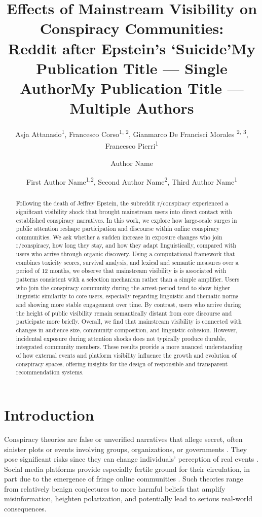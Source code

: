 \documentclass[letterpaper]{article} %
\title{Effects of Mainstream Visibility on Conspiracy Communities:\\Reddit after Epstein's `Suicide'}
\author{
    Asja Attanasio\textsuperscript{\rm 1},
    Francesco Corso\textsuperscript{\rm 1, \rm2},
    Gianmarco De Francisci Morales\textsuperscript{ \rm2, \rm3},
    Francesco Pierri\textsuperscript{\rm 1}
}
\title{My Publication Title --- Single Author}
\author {
    Author Name
}
\title{My Publication Title --- Multiple Authors}
\author {
    First Author Name\textsuperscript{\rm 1,\rm 2},
    Second Author Name\textsuperscript{\rm 2},
    Third Author Name\textsuperscript{\rm 1}
}
\begin{document}
\maketitle

\begin{abstract}
Following the death of Jeffrey Epstein, the subreddit r/conspiracy experienced a significant visibility shock that brought mainstream users into direct contact with established conspiracy narratives.
In this work, we explore how large-scale surges in public attention reshape participation and discourse within online conspiracy communities.
We ask whether a sudden increase in exposure changes who join r/conspiracy, how long they stay, and how they adapt linguistically, compared with users who arrive through organic discovery. 
Using a computational framework that combines toxicity scores, survival analysis, and lexical and semantic measures over a period of 12 months, 
we observe that mainstream visibility is is associated with patterns consistent with a selection mechanism rather than a simple amplifier.
Users who join the conspiracy community during the arrest-period tend to show higher linguistic similarity to core users, especially regarding linguistic and thematic norms and showing more stable engagement over time. 
By contrast, users who arrive during the height of public visibility remain semantically distant from core discourse and participate more briefly. 
Overall, we find that mainstream visibility is connected with changes in audience size, community composition, and linguistic cohesion.
However, incidental exposure during attention shocks does not typically produce durable, integrated community members.
These results provide a more nuanced understanding of how external events and platform visibility influence the growth and evolution of conspiracy spaces, offering insights for the design of responsible and transparent recommendation systems.
\end{abstract}

\section{Introduction}
Conspiracy theories are false or unverified narratives that allege secret,
often sinister plots or events involving groups, organizations, or governments \cite{douglas2023conspiracy}.
They pose significant risks since they can change individuals' perception of real events \cite{uscinski2017climate}.
Social media platforms provide especially fertile ground for their circulation, in part due to the emergence of fringe online communities \cite{rollo2022communities,spohr2017fake}.
Such theories range from relatively benign conjectures to more harmful beliefs that amplify misinformation, heighten polarization, and potentially lead to serious real-world consequences.
\end{document}

